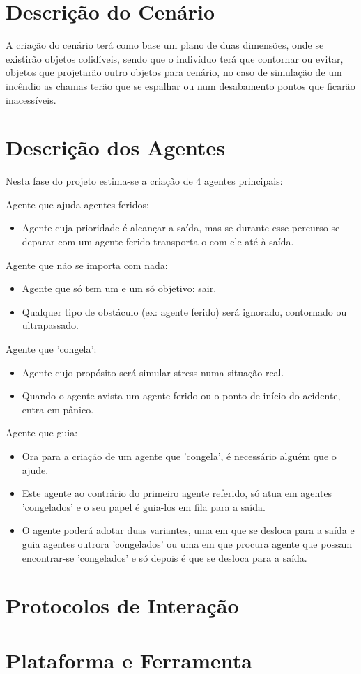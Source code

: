 \documentclass[a4paper,11pt]{article}
\begin{document}
\section{Descrição do Cenário}

A criação do cenário terá como base um plano de duas dimensões, onde se existirão objetos colidíveis, sendo que o indivíduo terá que contornar ou evitar, objetos que projetarão outro objetos para cenário, no caso de simulação de um incêndio as chamas terão que se espalhar ou num desabamento pontos que ficarão inacessíveis. 


\section{Descrição dos Agentes}
Nesta fase do projeto estima-se a criação de 4 agentes principais:

Agente que ajuda agentes feridos:
\begin{itemize}
\item Agente cuja prioridade é alcançar a saída, mas se durante esse percurso se deparar com um agente ferido transporta-o com ele até à saída.
\\
\end{itemize}

Agente que não se importa com nada:
\begin{itemize}
\item Agente que só tem um e um só objetivo: sair. 
\item Qualquer tipo de obstáculo (ex: agente ferido) será ignorado, contornado ou ultrapassado. 
\\
\end{itemize}

Agente que 'congela':
\begin{itemize}
\item Agente cujo propósito será simular stress numa situação real. 
\item Quando o agente avista um agente ferido ou o ponto de início do acidente, entra em pânico. 
\\
\end{itemize}

Agente que guia:
\begin{itemize}
\item Ora para a criação de um agente que 'congela', é necessário alguém que o ajude.
\item Este agente ao contrário do primeiro agente referido, só atua em agentes 'congelados' e o seu papel é guia-los em fila para a saída.
\item O agente poderá adotar duas variantes, uma em que se desloca para a saída e guia agentes outrora 'congelados' ou uma em que procura agente que possam encontrar-se 'congelados' e só depois é que se desloca para a saída.
\end{itemize}

\section{Protocolos de Interação}

\section{Plataforma e Ferramenta}  
\end{document}
